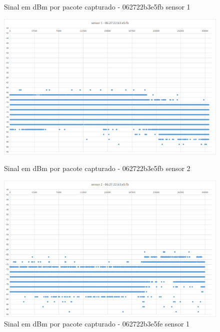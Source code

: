 \begin{figure}[htb]
	\begin{minipage}{0.49\textwidth}
	\centering
		\caption{\label{fig-062722b3e5fb-s1}Sinal em dBm por pacote capturado - 062722b3e5fb sensor 1}
		\includegraphics[width=1\textwidth]{060-testes/data-analisis/night-run/062722b3e5fb-sensor-01.png}
	\end{minipage}
\hfill
	\begin{minipage}{0.49\textwidth}
	\centering
		\caption{\label{fig-062722b3e5fb-s2}Sinal em dBm por pacote capturado - 062722b3e5fb sensor 2}
		\includegraphics[width=1\textwidth]{060-testes/data-analisis/night-run/062722b3e5fb-sensor-02.png}
	\end{minipage}
\hfill
	\begin{minipage}{0.49\textwidth}
	\centering
		\caption{\label{fig-062722b3e5fe-s1}Sinal em dBm por pacote capturado - 062722b3e5fe sensor 1}

\end{minipage}
\end{figure}
